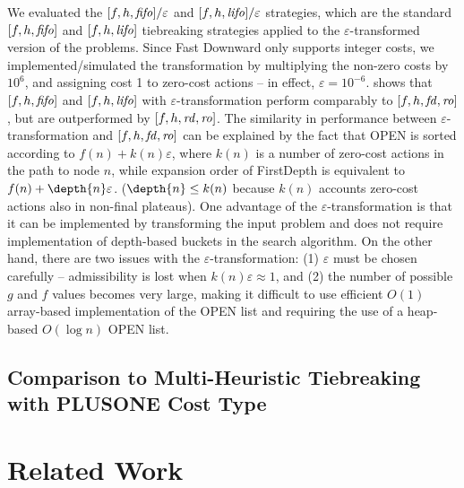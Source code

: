We evaluated the $[f,h,{\mbox{\textit{fifo}}}]/\varepsilon$ and $[f,h,{\mbox{\textit{lifo}}}]/\varepsilon$ strategies, which are the standard $[f,h,{\mbox{\textit{fifo}}}]$ and $[f,h,{\mbox{\textit{lifo}}}]$ tiebreaking strategies applied to  the $\varepsilon$-transformed version of the problems.
Since Fast Downward  only supports integer costs, we implemented/simulated the transformation by multiplying the non-zero costs by $10^6$, and assigning cost 1 to zero-cost actions -- in effect,  $\varepsilon=10^{-6}$.
 shows that $[f,h,{\mbox{\textit{fifo}}}]$ and $[f,h,{\mbox{\textit{lifo}}}]$ with $\varepsilon$-transformation
 perform comparably to $[f,h,{\mbox{\textit{fd}}},{\mbox{\textit{ro}}}]$, but are outperformed by $[f,h,{\mbox{\textit{rd}}},{\mbox{\textit{ro}}}]$.
% 
The similarity in performance between $\varepsilon$-transformation and $[f,h,{\mbox{\textit{fd}}},{\mbox{\textit{ro}}}]$ can be explained by the fact that  OPEN is sorted according to  $f(n)+k(n)\varepsilon$,
where $k(n)$ is a number of zero-cost actions in the path to node $n$,
while expansion order of FirstDepth is equivalent to $f(n)+\depth{n}\varepsilon$.
($\depth{n}\leq k(n)$ because $k(n)$ accounts zero-cost actions also in non-final plateaus).
% 
One advantage of the $\varepsilon$-transformation is that it can be implemented by transforming the input problem and does not require implementation of depth-based buckets in the search algorithm.
On the other hand, there are two issues with the $\varepsilon$-transformation:
(1) $\varepsilon$ must be chosen carefully -- admissibility is lost  when $k(n)\varepsilon\approx 1$, and
(2) the number of possible $g$ and $f$ values becomes very large, making it difficult to use efficient $O(1)$ array-based implementation of the OPEN list and requiring the use of a heap-based $O(\log n)$ OPEN list.

\subsection{Comparison to Multi-Heuristic Tiebreaking with PLUSONE Cost Type}



\section{Related Work}
\label{sec-4}

